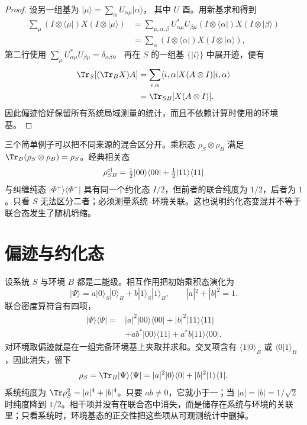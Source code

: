\begin{proof}
设另一组基为
\(\lvert\mu\rangle=\sum_\alpha U_{\alpha\mu}\lvert\alpha\rangle\)，
其中 \(U\) 酉。用新基求和得到
\[
\begin{aligned}
\sum_\mu(I\otimes\langle\mu\rvert)X(I\otimes\lvert\mu\rangle)
&=\sum_{\mu,\alpha,\beta}
U_{\alpha\mu}^*U_{\beta\mu}
(I\otimes\langle\alpha\rvert)X(I\otimes\lvert\beta\rangle)\\
&=\sum_\alpha
(I\otimes\langle\alpha\rvert)X(I\otimes\lvert\alpha\rangle),
\end{aligned}
\]
第二行使用
\(\sum_\mu U_{\alpha\mu}^*U_{\beta\mu}=\delta_{\alpha\beta}\)。
再在 \(S\) 的一组基 \(\{\lvert i\rangle\}\) 中展开迹，便有
\[
\begin{aligned}
\Tr_S[(\Tr_BX)A]
&=\sum_{i,\alpha}
\langle i,\alpha\rvert X(A\otimes I)\lvert i,\alpha\rangle\\
&=\Tr_{SB}[X(A\otimes I)].
\end{aligned}
\]
因此偏迹恰好保留所有系统局域测量的统计，而且不依赖计算时使用的环境基。
\end{proof}

三个简单例子可以把不同来源的混合区分开。乘积态
\(\rho_S\otimes\rho_B\) 满足
\(\Tr_B(\rho_S\otimes\rho_B)=\rho_S\)。经典相关态
\[
\rho_{SB}^{\rm cl}
=\tfrac12\lvert00\rangle\langle00\rvert
+\tfrac12\lvert11\rangle\langle11\rvert
\]
与纠缠纯态
\(\lvert\Phi^+\rangle\langle\Phi^+\rvert\)
具有同一个约化态 \(I/2\)，但前者的联合纯度为 \(1/2\)，后者为 \(1\)。只看 \(S\) 无法区分二者；必须测量系统--环境关联。这也说明约化态变混并不等于联合态发生了随机坍缩。

\section{偏迹与约化态}

设系统 $S$ 与环境 $B$ 都是二能级。相互作用把初始乘积态演化为
\begin{equation}
|\Psi\rangle=a|0\rangle_S|0\rangle_B+b|1\rangle_S|1\rangle_B,
\qquad |a|^2+|b|^2=1.
\label{eq:oqs-two-qubit-entangled}
\end{equation}
联合密度算符含有四项，
\begin{align*}
|\Psi\rangle\langle\Psi|
={}&|a|^2|00\rangle\langle00|+|b|^2|11\rangle\langle11|\\
&+ab^*|00\rangle\langle11|+a^*b|11\rangle\langle00|.
\end{align*}
对环境取偏迹就是在一组完备环境基上夹取并求和。交叉项含有
$\langle1|0\rangle_B$ 或 $\langle0|1\rangle_B$，因此消失，留下
\begin{equation}
\rho_S=\Tr_B|\Psi\rangle\langle\Psi|
=|a|^2|0\rangle\langle0|+|b|^2|1\rangle\langle1|.
\label{eq:oqs-two-qubit-reduced}
\end{equation}
系统纯度为 $\Tr\rho_S^2=|a|^4+|b|^4$。只要 $ab\neq0$，它就小于一；当 $|a|=|b|=1/\sqrt2$ 时纯度降到 $1/2$。相干项并没有在联合态中消失，而是储存在系统与环境的关联里；只看系统时，环境基态的正交性把这些项从可观测统计中删掉。

